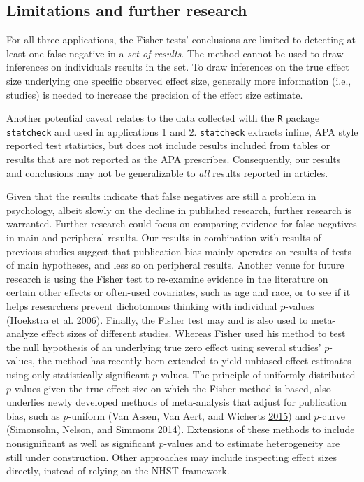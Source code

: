 \documentclass[a5paper]{book}
\begin{document}
\subsection{Limitations and further
research}\label{limitations-and-further-research}

For all three applications, the Fisher tests' conclusions are limited to
detecting at least one false negative in a \emph{set of results}. The
method cannot be used to draw inferences on individuals results in the
set. To draw inferences on the true effect size underlying one specific
observed effect size, generally more information (i.e., studies) is
needed to increase the precision of the effect size estimate.

Another potential caveat relates to the data collected with the
\texttt{R} package \texttt{statcheck} and used in applications 1 and 2.
\texttt{statcheck} extracts inline, APA style reported test statistics,
but does not include results included from tables or results that are
not reported as the APA prescribes. Consequently, our results and
conclusions may not be generalizable to \emph{all} results reported in
articles.

Given that the results indicate that false negatives are still a problem
in psychology, albeit slowly on the decline in published research,
further research is warranted. Further research could focus on comparing
evidence for false negatives in main and peripheral results. Our results
in combination with results of previous studies suggest that publication
bias mainly operates on results of tests of main hypotheses, and less so
on peripheral results. Another venue for future research is using the
Fisher test to re-examine evidence in the literature on certain other
effects or often-used covariates, such as age and race, or to see if it
helps researchers prevent dichotomous thinking with individual
\(p\)-values (Hoekstra et al.
\protect\hyperlink{ref-doi:10.3758ux2fbf03213921}{2006}). Finally, the
Fisher test may and is also used to meta-analyze effect sizes of
different studies. Whereas Fisher used his method to test the null
hypothesis of an underlying true zero effect using several studies'
\(p\)-values, the method has recently been extended to yield unbiased
effect estimates using only statistically significant \(p\)-values. The
principle of uniformly distributed \(p\)-values given the true effect
size on which the Fisher method is based, also underlies newly developed
methods of meta-analysis that adjust for publication bias, such as
\(p\)-uniform (Van Assen, Van Aert, and Wicherts
\protect\hyperlink{ref-doi:10.1037ux2fmet0000025}{2015}) and \(p\)-curve
(Simonsohn, Nelson, and Simmons
\protect\hyperlink{ref-doi:10.1037ux2fa0033242}{2014}). Extensions of
these methods to include nonsignificant as well as significant
\(p\)-values and to estimate heterogeneity are still under construction.
Other approaches may include inspecting effect sizes directly, instead
of relying on the NHST framework.
\end{document}
